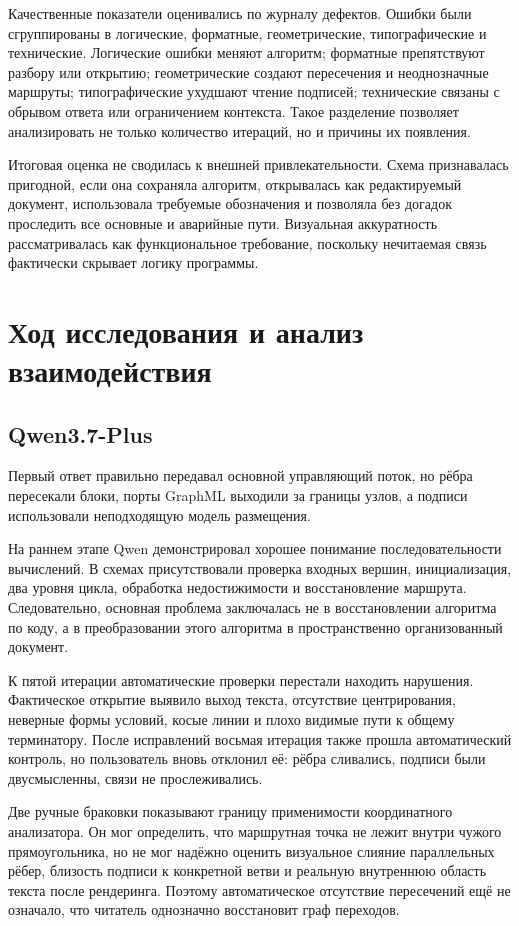 \documentclass[a4paper,12pt]{extreport}
\begin{document}
Качественные показатели оценивались по журналу дефектов. Ошибки были сгруппированы в логические, форматные, геометрические, типографические и технические. Логические ошибки меняют алгоритм; форматные препятствуют разбору или открытию; геометрические создают пересечения и неоднозначные маршруты; типографические ухудшают чтение подписей; технические связаны с обрывом ответа или ограничением контекста. Такое разделение позволяет анализировать не только количество итераций, но и причины их появления.

Итоговая оценка не сводилась к внешней привлекательности. Схема признавалась пригодной, если она сохраняла алгоритм, открывалась как редактируемый документ, использовала требуемые обозначения и позволяла без догадок проследить все основные и аварийные пути. Визуальная аккуратность рассматривалась как функциональное требование, поскольку нечитаемая связь фактически скрывает логику программы.

\section{Ход исследования и анализ взаимодействия}

\subsection{Qwen3.7-Plus}

Первый ответ правильно передавал основной управляющий поток, но рёбра пересекали блоки, порты GraphML выходили за границы узлов, а подписи использовали неподходящую модель размещения.

На раннем этапе Qwen демонстрировал хорошее понимание последовательности вычислений. В схемах присутствовали проверка входных вершин, инициализация, два уровня цикла, обработка недостижимости и восстановление маршрута. Следовательно, основная проблема заключалась не в восстановлении алгоритма по коду, а в преобразовании этого алгоритма в пространственно организованный документ.

К пятой итерации автоматические проверки перестали находить нарушения. Фактическое открытие выявило выход текста, отсутствие центрирования, неверные формы условий, косые линии и плохо видимые пути к общему терминатору. После исправлений восьмая итерация также прошла автоматический контроль, но пользователь вновь отклонил её: рёбра сливались, подписи были двусмысленны, связи не прослеживались.

Две ручные браковки показывают границу применимости координатного анализатора. Он мог определить, что маршрутная точка не лежит внутри чужого прямоугольника, но не мог надёжно оценить визуальное слияние параллельных рёбер, близость подписи к конкретной ветви и реальную внутреннюю область текста после рендеринга. Поэтому автоматическое отсутствие пересечений ещё не означало, что читатель однозначно восстановит граф переходов.
\end{document}
